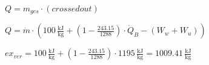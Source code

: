 \( Q = m_{ges} \cdot (crossed out) \)  

\( Q = \dot{m} \cdot \left( 100 \, \frac{\text{kJ}}{\text{kg}} + \left( 1 - \frac{243.15}{1288} \right) \cdot \dot{Q}_B - (W_{w} + W_{u}) \right) \)  

\( ex_{ver} = 100 \, \frac{\text{kJ}}{\text{kg}} + \left( 1 - \frac{243.15}{1288} \right) \cdot 1195 \, \frac{\text{kJ}}{\text{kg}} = 1009.41 \, \frac{\text{kJ}}{\text{kg}} \)